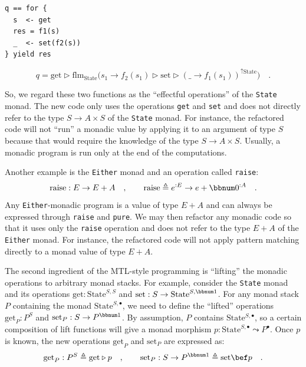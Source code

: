 \begin{lstlisting}
q == for {
  s  <- get
  res = f1(s)
  _  <- set(f2(s))
} yield res
\end{lstlisting}
\[
q=\text{get}\triangleright\text{flm}_{\text{State}}\big(s_{1}\rightarrow f_{2}(s_{1})\triangleright\text{set}\triangleright(\_\rightarrow f_{1}(s_{1}))^{\uparrow\text{State}}\big)\quad.
\]

So, we regard these two functions as the \textsf{``}effectful operations\textsf{''}
of the \lstinline!State! monad. The new code only uses the operations
\lstinline!get! and \lstinline!set! and does not directly refer
to the type $S\rightarrow A\times S$ of the \lstinline!State! monad.
For instance, the refactored code will not \textsf{``}run\textsf{''} a monadic value
by applying it to an argument of type $S$ because that would require
the knowledge of the type $S\rightarrow A\times S$. Usually, a monadic
program is run only at the end of the computations.

Another example is the \lstinline!Either! monad and an operation
called \lstinline!raise!:
\[
\text{raise}:E\rightarrow E+A\quad,\quad\quad\text{raise}\triangleq e^{:E}\rightarrow e+\bbnum 0^{:A}\quad.
\]
Any \lstinline!Either!-monadic program is a value of type $E+A$
and can always be expressed through \lstinline!raise! and \lstinline!pure!.
We may then refactor any monadic code so that it uses only the \lstinline!raise!
operation and does not refer to the type $E+A$ of the \lstinline!Either!
monad. For instance, the refactored code will not apply pattern matching
directly to a monad value of type $E+A$.

The second ingredient of the MTL-style programming is \textsf{``}lifting\textsf{''}
the monadic operations to arbitrary monad stacks. For example, consider
the \lstinline!State! monad and its operations $\text{get}:\text{State}^{S,S}$
and $\text{set}:S\rightarrow\text{State}^{S,\bbnum 1}$. For any monad
stack $P$ containing the monad $\text{State}^{S,\bullet}$, we need
to define the \textsf{``}lifted\textsf{''} operations $\text{get}_{P}:P^{S}$ and
$\text{set}_{P}:S\rightarrow P^{\bbnum 1}$. By assumption, $P$ contains
$\text{State}{}^{S,\bullet}$, so a certain composition of lift functions
will give a monad morphism $p:\text{State}^{S,\bullet}\leadsto P^{\bullet}$.
Once $p$ is known, the new operations $\text{get}_{P}$ and $\text{set}_{P}$
are expressed as:
\[
\text{get}_{P}:P^{S}\triangleq\text{get}\triangleright p\quad,\quad\quad\text{set}_{P}:S\rightarrow P^{\bbnum 1}\triangleq\text{set}\bef p\quad.
\]

